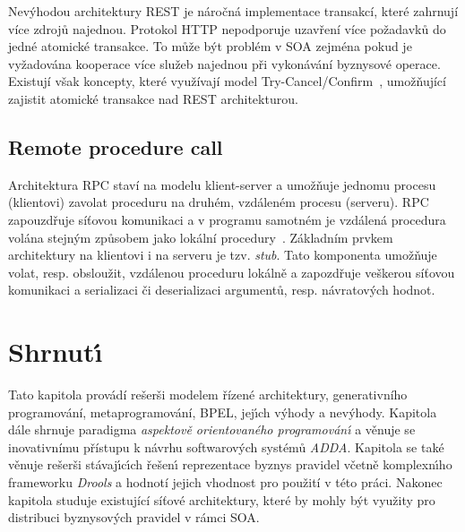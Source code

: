 Nevýhodou architektury \gls{REST} je náročná implementace transakcí, které zahrnují více
zdrojů najednou. Protokol \gls{HTTP} nepodporuje uzavření více požadavků do jedné atomické
transakce. To může být problém v \gls{SOA} zejména pokud je vyžadována kooperace více služeb
najednou při vykonávání byznysové operace. Existují však koncepty, které využívají model
Try-Cancel/Confirm~\cite{pardon2011towards}, umožňující zajistit atomické transakce nad
\gls{REST} architekturou.

\subsection{Remote procedure call}\label{sec:rpc}

Architektura \gls{RPC} staví na modelu klient-server a umožňuje jednomu procesu (klientovi)
zavolat proceduru na druhém, vzdáleném procesu (serveru).
\gls{RPC} zapouzdřuje síťovou komunikaci a v programu samotném
je vzdálená procedura volána stejným způsobem jako lokální procedury~\cite{nelson1981remote}. Základním
prvkem architektury na klientovi i na serveru je tzv. \textit{stub}. Tato komponenta
umožňuje volat, resp. obsloužit, vzdálenou proceduru lokálně a zapozdřuje veškerou
síťovou komunikaci a serializaci či deserializaci argumentů, resp. návratových hodnot.

\section{Shrnut\'{\i}}

Tato kapitola provádí rešerši modelem řízené architektury,
generativního programování, metaprogramování, \gls{BPEL}, jej\'{\i}ch v\'yhody a nev\'yhody.
Kapitola dále shrnuje paradigma \textit{aspektově orientovaného programován\'{\i}} a
věnuje se inovativnímu přístupu k návrhu softwarov\'ych systémů \textit{ADDA}.
Kapitola se také věnuje rešerši stávaj\'{\i}c\'{\i}ch řešen\'{\i} reprezentace byznys pravidel
včetně komplexn\'{\i}ho frameworku \textit{Drools} a hodnotí jejich vhodnost pro použití v této práci.
Nakonec kapitola studuje existující síťové architektury, které by mohly být využity
pro distribuci byznysových pravidel v rámci \gls{SOA}.
